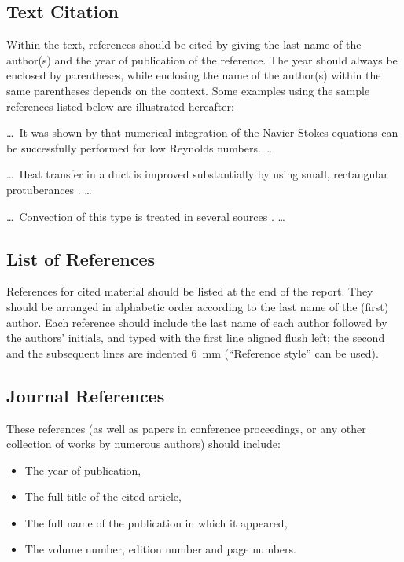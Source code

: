 \documentclass[bibtex,pagenumbers]{stabs2021}
\begin{document}
\subsection{Text Citation}

Within the text, references should be cited by giving the last name of
the author(s) and the year of publication of the reference. The year
should always be enclosed by parentheses, while enclosing the name of
the author(s) within the same parentheses depends on the context. Some
examples using the sample references listed below are illustrated
hereafter:



\dots\ It was shown by \citet{kwon1981prediction} that numerical
integration of the Navier-Stokes equations can be successfully
performed for low Reynolds numbers. \dots

\dots\ Heat transfer in a duct is improved substantially by using
small, rectangular protuberances \citep{sparrow1980forced}. \dots

\dots\ Convection of this type is treated in several sources
\citep{lee1982structure, sparrow1980fluid, tung1982evaporative}. \dots

\subsection{List of References}

References for cited material should be listed at the end of the
report. They should be arranged in alphabetic order according to the
last name of the (first) author. Each reference should include the
last name of each author followed by the authors' initials, and typed
with the first line aligned flush left; the second and the subsequent
lines are indented 6~mm (``Reference style'' can be used).

\subsection{Journal References}

These references (as well as papers in conference proceedings, or any
other collection of works by numerous authors) should include:
\begin{itemize}
  \item The year of publication,
  \item The full title of the cited article,
  \item The full name of the publication in which it appeared,
  \item The volume number, edition number and page numbers.
\end{itemize}
\end{document}

